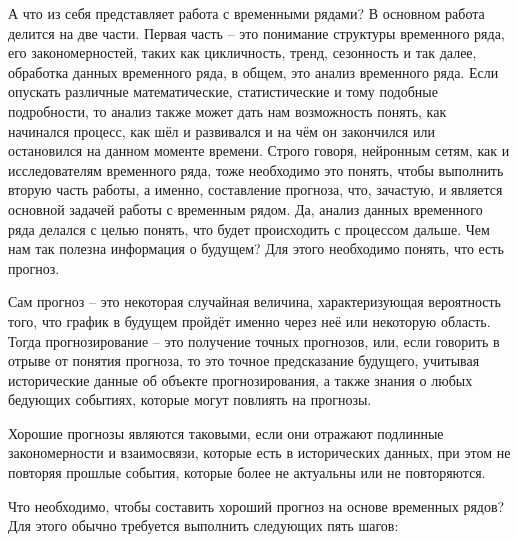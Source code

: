 {  \par \redline А что из себя представляет работа с временными рядами? В основном работа делится на две части. Первая часть – это понимание структуры временного ряда, его закономерностей, таких как цикличность, тренд, сезонность и так далее, обработка данных временного ряда, в общем, это анализ временного ряда. Если опускать различные математические, статистические и тому подобные подробности, то анализ также может дать нам возможность понять, как начинался процесс, как шёл и развивался и на чём он закончился или остановился на данном моменте времени.  Строго говоря, нейронным сетям, как и исследователям временного ряда, тоже необходимо это понять, чтобы выполнить вторую часть работы, а именно, составление прогноза, что, зачастую, и является основной задачей работы с временным рядом. Да, анализ данных временного ряда делался с целью понять, что будет происходить с процессом дальше. Чем нам так полезна информация о будущем? Для этого необходимо понять, что есть прогноз. 

  \par \redline Сам прогноз – это некоторая случайная величина, характеризующая вероятность того, что график в будущем пройдёт именно через неё или некоторую область. Тогда прогнозирование – это получение точных прогнозов, или, если говорить в отрыве от понятия прогноза, то это точное предсказание будущего, учитывая исторические данные об объекте прогнозирования, а также знания о любых бедующих событиях, которые могут повлиять на прогнозы. 

  \par \redline Хорошие прогнозы являются таковыми, если они отражают подлинные закономерности и взаимосвязи, которые есть в исторических данных, при этом не повторяя прошлые события, которые более не актуальны или не повторяются. 

  \par \redline Что необходимо, чтобы составить хороший прогноз на основе временных рядов? Для этого обычно требуется выполнить следующих пять шагов:

}
